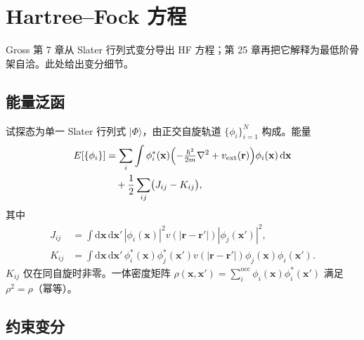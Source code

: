 \section{Hartree--Fock 方程}

Gross 第 7 章从 Slater 行列式变分导出 HF 方程；第 25 章再把它解释为最低阶骨架自洽。此处给出变分细节。

\subsection{能量泛函}

试探态为单一 Slater 行列式 $|\Phi\rangle$，由正交自旋轨道 $\{\phi_i\}_{i=1}^N$ 构成。能量
\begin{equation}
\begin{aligned}
  E[\{\phi_i\}]
  &=\sum_i \int\phi_i^*(\mathbf{x})
  \Bigl(-\tfrac{\hbar^2}{2m}\nabla^2+v_{\mathrm{ext}}(\mathbf{r})\Bigr)
  \phi_i(\mathbf{x})\,\mathrm{d}\mathbf{x}\\
  &\quad+\frac12\sum_{ij}\bigl(J_{ij}-K_{ij}\bigr),
\end{aligned}
\end{equation}
其中
\begin{equation}
\begin{aligned}
  J_{ij}
  &=\int\mathrm{d}\mathbf{x}\,\mathrm{d}\mathbf{x}'\,
  |\phi_i(\mathbf{x})|^2
  v(|\mathbf{r}-\mathbf{r}'|)
  |\phi_j(\mathbf{x}')|^2,\\
  K_{ij}
  &=\int\mathrm{d}\mathbf{x}\,\mathrm{d}\mathbf{x}'\,
  \phi_i^*(\mathbf{x})\phi_j^*(\mathbf{x}')
  v(|\mathbf{r}-\mathbf{r}'|)
  \phi_j(\mathbf{x})\phi_i(\mathbf{x}').
\end{aligned}
\end{equation}
$K_{ij}$ 仅在同自旋时非零。一体密度矩阵 $\rho(\mathbf{x},\mathbf{x}')=\sum_i^{\mathrm{occ}}\phi_i(\mathbf{x})\phi_i^*(\mathbf{x}')$ 满足 $\rho^2=\rho$（幂等）。

\subsection{约束变分}

